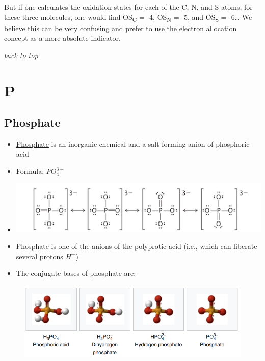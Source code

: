 \documentclass[]{book}
\providecommand{\tightlist}{%
  \setlength{\itemsep}{0pt}\setlength{\parskip}{0pt}}
\theoremstyle{definition}
\theoremstyle{definition}
\theoremstyle{definition}
\theoremstyle{remark}
\begin{document}
But if one calculates the oxidation states for each of the C, N, and S
atoms, for these three molecules, one would find OS\textsubscript{C} =
-4, OS\textsubscript{N} = -5, and OS\textsubscript{S} = -6\ldots{} We
believe this can be very confusing and prefer to use the electron
allocation concept as a more absolute indicator.

\emph{\protect\hyperlink{top}{back to top}}

\section{P}\label{p}

\subsection{Phosphate}\label{phosphate}

\begin{itemize}
\tightlist
\item
  \href{https://en.wikipedia.org/wiki/Phosphate}{Phosphate} is an
  inorganic chemical and a salt-forming anion of phosphoric acid
\item
  Formula: \(PO_4^{3-}\)
\item
  \includegraphics{pictures/phosphate_lewis_structure.jpg}
\item
  Phosphate is one of the anions of the polyprotic acid (i.e., which can
  liberate several protons \(H^{+}\))
\item
  The conjugate bases of phosphate are:
\end{itemize}

\begin{figure}
\centering
\includegraphics[width=1.00000\textwidth]{pictures/phosphate_conjugate_bases.png}
\caption{}
\end{figure}
\end{document}

